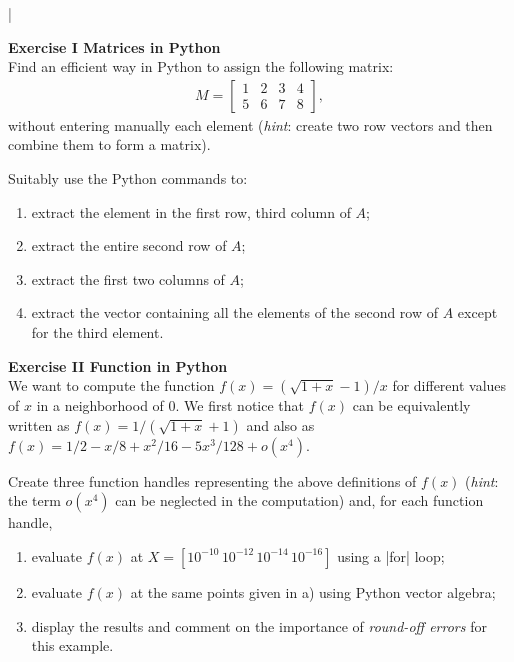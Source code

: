 \documentclass[11pt]{article}
\begin{document}
\lstset{frameround=fttt,language=Matlab}

\lstMakeShortInline[columns=fixed]|



{\bf{Exercise I Matrices in Python}}\\

Find an efficient way in Python to assign the following matrix:
\begin{align*}
M = \begin{bmatrix}
    1 & 2 & 3 & 4 \\
    5 & 6 & 7 & 8
\end{bmatrix},
\end{align*}
without entering manually each element (\textit{hint}: create two row vectors and then combine them to form a matrix). 

Suitably use the Python commands to:
\begin{enumerate}
\item extract the element in the first row, third column of $A$;
\item extract the entire second row of $A$;
\item extract the first two columns of $A$;
\item extract the vector containing all the elements of the second row of $A$ except for the third element.
\end{enumerate}

\bigskip

{\bf{Exercise II Function in Python}}\\

We want to compute the function $f(x) = (\sqrt{1+x}-1)/x$ for different values of $x$ in a neighborhood of 0. We first notice that $f(x)$ can be equivalently written as $f(x) = 1/(\sqrt{1+x}+1)$ and also as $f(x)=1/2 - x/8 + x^2/16 - 5x^3/128 + o(x^4)$.

Create three function handles representing the above definitions of $f(x)$ (\textit{hint}: the term $o(x^4)$ can be neglected in the computation) and, for each function handle,
\begin{enumerate}
\item evaluate $f(x)$ at $X = [10^{-10} \, 10^{-12} \, 10^{-14} \, 10^{-16}]$ using a |for| loop;
\item evaluate $f(x)$ at the same points given in a) using Python vector algebra;
\item display the results and comment on the importance of \textit{round-off errors} for this example.
\end{enumerate}
\end{document}
